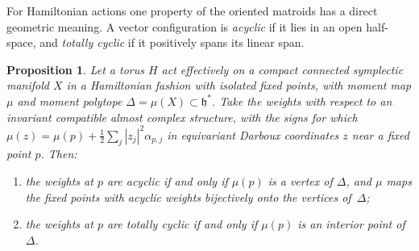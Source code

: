 \documentclass[11pt,a4paper]{article}
\numberwithin{equation}{section}
\theoremstyle{plain}
\newtheorem{proposition}[theorem]{Proposition}
\theoremstyle{definition}
\theoremstyle{remark}
\begin{document}
For Hamiltonian actions one property of the oriented matroids has a direct geometric meaning. A vector configuration is \emph{acyclic} if it lies in an open half-space, and \emph{totally cyclic} if it positively spans its linear span.

\begin{proposition}\label{prop:moment}
Let a torus $H$ act effectively on a compact connected symplectic manifold $X$ in a Hamiltonian fashion with isolated fixed points, with moment map $\mu$ and moment polytope $\Delta=\mu(X)\subset\mathfrak h^*$. Take the weights with respect to an invariant compatible almost complex structure, with the signs for which $\mu(z)=\mu(p)+\frac12\sum_j|z_j|^2\alpha_{p,j}$ in equivariant Darboux coordinates $z$ near a fixed point $p$. Then:
\begin{enumerate}[nosep,label=(\arabic*)]
\item the weights at $p$ are acyclic if and only if $\mu(p)$ is a vertex of $\Delta$, and $\mu$ maps the fixed points with acyclic weights bijectively onto the vertices of~$\Delta$;
\item the weights at $p$ are totally cyclic if and only if $\mu(p)$ is an interior point of~$\Delta$.
\end{enumerate}
\end{proposition}
\end{document}

